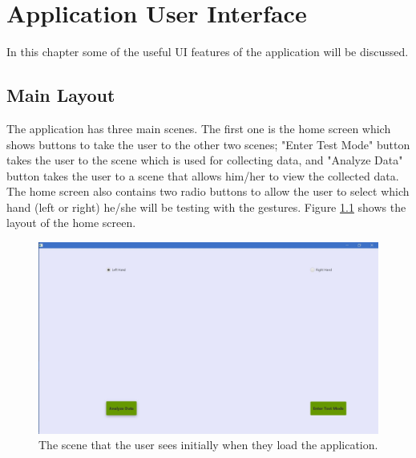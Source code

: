 \chapter{Application User Interface }

\label{Chapter6_appUI} 

In this chapter some of the useful UI features of the application will be discussed. 

\section{Main Layout}

The application has three main scenes. The first one is the home screen which shows buttons to take the user to the other two scenes; "Enter Test Mode" button takes the user to the scene which is used for collecting data, and "Analyze Data" button takes the user to a scene that allows him/her to view the collected data. The home screen also contains two radio buttons to allow the user to select which hand (left or right) he/she will be testing with the gestures. Figure  \ref{fig:homeScreen} shows the layout of the home screen. 
\begin{figure}[H]
\centering
\includegraphics[scale=0.35]{Figures/6_homeScreen.JPG}
\caption[Home Screen Layout]{The scene that the user sees initially when they load the application.}
\label{fig:homeScreen}
\end{figure}


